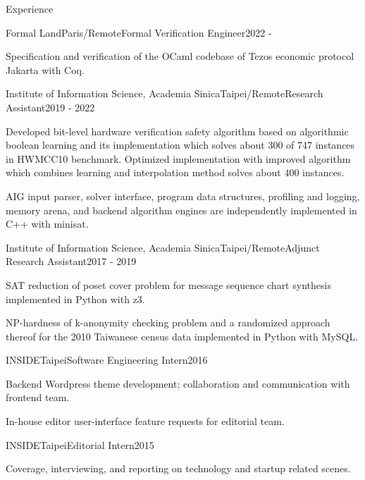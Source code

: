 \documentclass{resume} %
\begin{document}
\begin{rSection}{Experience}

\begin{rSubsection}{Formal Land}{Paris/Remote}{Formal Verification Engineer}{2022 - }
\item Specification and verification of the OCaml codebase of Tezos
economic protocol Jakarta with Coq.
\end{rSubsection}


\begin{rSubsection}{Institute of Information Science, Academia Sinica}{Taipei/Remote}{Research Assistant}{2019 - 2022}
\item Developed bit-level hardware verification safety algorithm based on algorithmic boolean learning and
its implementation which solves about 300 of 747 instances in HWMCC10 benchmark.
Optimized implementation with improved algorithm which combines learning and interpolation method solves about 400 instances.
\item AIG input parser, solver interface, program data structures, profiling and logging,
memory arena, and backend algorithm engines are independently implemented in C++ with minisat.
\end{rSubsection}


\begin{rSubsection}{Institute of Information Science, Academia Sinica}{Taipei/Remote}{Adjunct Research Assistant}{2017 - 2019}
\item SAT reduction of poset cover problem for message sequence chart synthesis  implemented in Python with z3.
\item NP-hardness of k-anonymity checking problem and a randomized approach thereof for the 2010 Taiwanese census data
implemented in Python with MySQL.
\end{rSubsection}


\begin{rSubsection}{INSIDE}{Taipei}{Software Engineering Intern}{2016}
\item Backend Wordpress theme development; collaboration  and communication with frontend team.
\item In-house editor user-interface feature requests for editorial team.
\end{rSubsection}


\begin{rSubsection}{INSIDE}{Taipei}{Editorial Intern}{2015}
\item Coverage, interviewing, and reporting on technology and startup related scenes.
\end{rSubsection}

\end{rSection}
\end{document}

